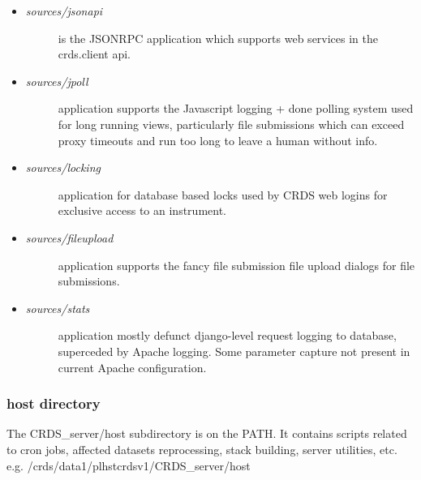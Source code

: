 \documentclass[letterpaper,10pt,english]{sphinxmanual}
\begin{document}
\begin{itemize}
\begin{description}
\end{description}

\item {} \begin{description}
\item[{\emph{sources/jsonapi}}] \leavevmode
is the JSONRPC application which supports web services in the crds.client api.

\end{description}

\item {} \begin{description}
\item[{\emph{sources/jpoll}}] \leavevmode
application supports the Javascript logging + done polling system used for long running views,
particularly file submissions which can exceed proxy timeouts and run too long to leave a human
without info.

\end{description}

\item {} \begin{description}
\item[{\emph{sources/locking}}] \leavevmode
application for database based locks used by CRDS web logins for exclusive access to an instrument.

\end{description}

\item {} \begin{description}
\item[{\emph{sources/fileupload}}] \leavevmode
application supports the fancy file submission file upload dialogs for file submissions.

\end{description}

\item {} \begin{description}
\item[{\emph{sources/stats}}] \leavevmode
application mostly defunct django-level request logging to database,  superceded by Apache
logging.  Some parameter capture not present in current Apache configuration.

\end{description}

\end{itemize}


\subsubsection{host directory}
\label{server_guide:host-directory}
The CRDS\_server/host subdirectory is on the PATH.  It contains scripts related to cron jobs,  affected datasets
reprocessing, stack building,  server utilities, etc.   e.g. /crds/data1/plhstcrdsv1/CRDS\_server/host
\end{document}
